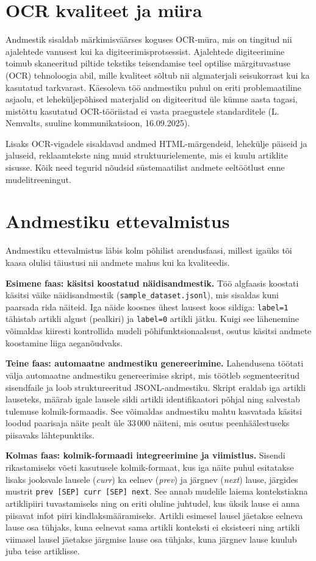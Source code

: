 \section{OCR kvaliteet ja müra}\label{sec:ocr-kvaliteet}
Andmestik sisaldab märkimisväärses koguses OCR-müra, mis on tingitud nii ajalehtede vanusest kui ka digiteerimisprotsessist. Ajalehtede digiteerimine toimub skaneeritud piltide tekstiks teisendamise teel optilise märgituvastuse (OCR) tehnoloogia abil, mille kvaliteet sõltub nii algmaterjali seisukorrast kui ka kasutatud tarkvarast. Käesoleva töö andmestiku puhul on eriti problemaatiline asjaolu, et leheküljepõhised materjalid on digiteeritud üle kümne aasta tagasi, mistõttu kasutatud OCR-tööriistad ei vasta praegustele standarditele (L. Nemvalts, suuline kommunikatsioon, 16.09.2025).

Lisaks OCR-vigadele sisaldavad andmed HTML-märgendeid, lehekülje päiseid ja jaluseid, reklaamtekste ning muid struktuurielemente, mis ei kuulu artiklite sisusse. Kõik need tegurid nõudsid süstemaatilist andmete eeltöötlust enne mudelitreeningut.


\section{Andmestiku ettevalmistus}\label{sec:andmestiku-ettevalmistus}
Andmestiku ettevalmistus läbis kolm põhilist arendusfaasi, millest igaüks tõi kaasa olulisi täiustusi nii andmete mahus kui ka kvaliteedis.

\textbf{Esimene faas: käsitsi koostatud näidisandmestik.} Töö algfaasis koostati käsitsi väike näidisandmestik (\texttt{sample\_dataset.jsonl}), mis sisaldas kuni paarsada rida näiteid. Iga näide koosnes ühest lausest koos sildiga: \texttt{label=1} tähistab artikli algust (pealkiri) ja \texttt{label=0} artikli jätku. Kuigi see lähenemine võimaldas kiiresti kontrollida mudeli põhifunktsionaalsust, osutus käsitsi andmete koostamine liiga aeganõudvaks.

\textbf{Teine faas: automaatne andmestiku genereerimine.} Lahendusena töötati välja automaatne andmestiku genereerimise skript, mis töötleb segmenteeritud sisendfaile ja loob struktureeritud JSONL-andmestiku. Skript eraldab iga artikli lauseteks, määrab igale lausele sildi artikli identifikaatori põhjal ning salvestab tulemuse kolmik-formaadis. See võimaldas andmestiku mahtu kasvatada käsitsi loodud paarisaja näite pealt üle 33\,000 näiteni, mis osutus peenhäälestuseks piisavaks lähtepunktiks.

\textbf{Kolmas faas: kolmik-formaadi integreerimine ja viimistlus.} Sisendi rikastamiseks võeti kasutusele kolmik-formaat, kus iga näite puhul esitatakse lisaks jooksvale lausele (\textit{curr}) ka eelnev (\textit{prev}) ja järgnev (\textit{next}) lause, järgides mustrit 
\texttt{prev [SEP] curr [SEP] next}. See annab mudelile laiema kontekstiakna artiklipiiri tuvastamiseks ning on eriti oluline juhtudel, kus üksik lause ei anna piisavat infot piiri kindlaksmääramiseks. Artikli esimesel lausel jäetakse eelneva lause osa tühjaks, kuna eelnevat sama artikli konteksti ei eksisteeri ning artikli viimasel lausel jäetakse järgmise lause osa tühjaks, kuna järgnev lause kuulub juba teise artiklisse.


